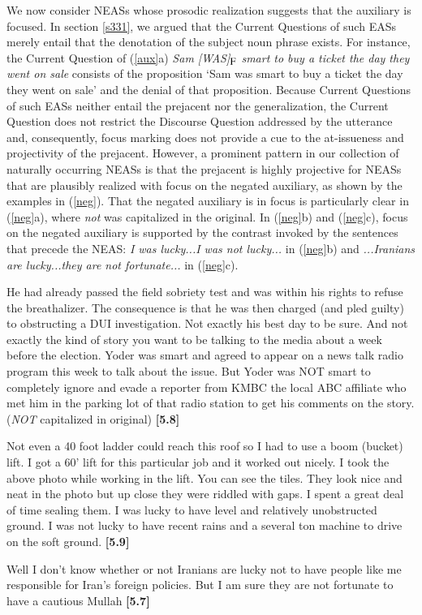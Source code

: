 \documentclass[11pt,fleqn]{article}
\newcommand{\foc}{$_{\mbox{\small F}}$}
\newcommand{\6}{\mbox{$[\hspace*{-.6mm}[$}}
\newcommand{\9}{\mbox{$]\hspace*{-.6mm}]$}}
\begin{document}
We now consider NEASs whose prosodic realization suggests that the auxiliary is focused. In section \ref{s331}, we argued that the Current Questions of such EASs merely entail that the denotation of the subject noun phrase exists. For instance, the Current Question of (\ref{aux}a) {\em Sam [WAS]\foc{} smart to buy a ticket the day they went on sale} consists of the proposition `Sam was smart to buy a ticket the day they went on sale' and the denial of that proposition. Because Current Questions of such EASs neither entail the prejacent nor the generalization, the Current Question does not restrict the Discourse Question addressed by the utterance and, consequently, focus marking does not provide a cue to the at-issueness and projectivity of the prejacent. However, a prominent pattern in our collection of naturally occurring NEASs is that the prejacent is highly projective for NEASs that are plausibly realized with focus on the negated auxiliary, as shown by the examples in (\ref{neg}). That the negated auxiliary is in focus is particularly clear in (\ref{neg}a), where {\em not} was capitalized in the original. In (\ref{neg}b) and (\ref{neg}c), focus on the negated auxiliary is supported by the contrast invoked by the sentences that precede the NEAS: {\em I was lucky...I was not lucky...} in (\ref{neg}b) and {\em ...Iranians are lucky...they are not fortunate...} in (\ref{neg}c). 

\begin{exe} 
\ex\label{neg}

\begin{xlist}

\ex He had already passed the field sobriety test and was within his
rights to refuse the breathalizer. The consequence is that he was then
charged (and pled guilty) to obstructing a DUI investigation. Not
exactly his best day  to be sure. And not exactly the kind of story you
want to be talking to the media about a week before the election. Yoder
was smart and agreed to appear on a news talk radio program this week
to talk about the issue. But Yoder was NOT smart to completely
ignore and evade a reporter from KMBC  the local ABC affiliate  who met
him in the parking lot of that radio station to get his comments on the
story. \hfill ({\em NOT} capitalized in original) {\bf [5.8]}

\ex Not even a 40 foot ladder could reach this roof  so I had to use a
boom (bucket) lift. I got a 60' lift for this particular job  and it
worked out nicely. I took the above photo while working in the lift. You
can see the tiles. They look nice and neat in the photo  but up close 
they were riddled with gaps. I spent a great deal of time sealing them.
I was lucky to have level and relatively unobstructed ground. I was not
lucky to have recent rains and a several ton machine to drive on
the soft ground. \hfill {\bf [5.9]}

\ex Well I don't know whether or not Iranians are lucky not to have
people like me responsible for Iran's foreign policies. But I am sure
they are not fortunate to have a cautious Mullah \hfill {\bf
[5.7]}

\end{xlist}

\end{exe}
\end{document}
